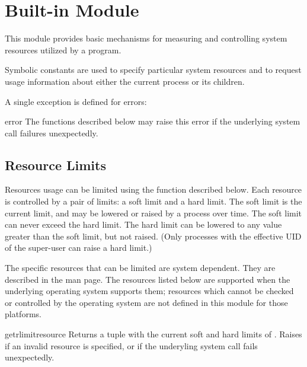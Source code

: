 \section{Built-in Module }
\label{module-resource}

This module provides basic mechanisms for measuring and controlling
system resources utilized by a program.

Symbolic constants are used to specify particular system resources and
to request usage information about either the current process or its
children.

A single exception is defined for errors:

\renewcommand{\indexsubitem}{(in module resource)}

\begin{excdesc}{error}
  The functions described below may raise this error if the underlying
  system call failures unexpectedly.
\end{excdesc}

\subsection{Resource Limits}

Resources usage can be limited using the  function
described below. Each resource is controlled by a pair of limits: a
soft limit and a hard limit. The soft limit is the current limit, and
may be lowered or raised by a process over time. The soft limit can
never exceed the hard limit. The hard limit can be lowered to any
value greater than the soft limit, but not raised. (Only processes with
the effective UID of the super-user can raise a hard limit.)

The specific resources that can be limited are system dependent. They
are described in the  man page.  The resources
listed below are supported when the underlying operating system
supports them; resources which cannot be checked or controlled by the
operating system are not defined in this module for those platforms.

\begin{funcdesc}{getrlimit}{resource}
  Returns a tuple  with the current
  soft and hard limits of . Raises  if
  an invalid resource is specified, or  if the
  underyling system call fails unexpectedly.
\end{funcdesc}

